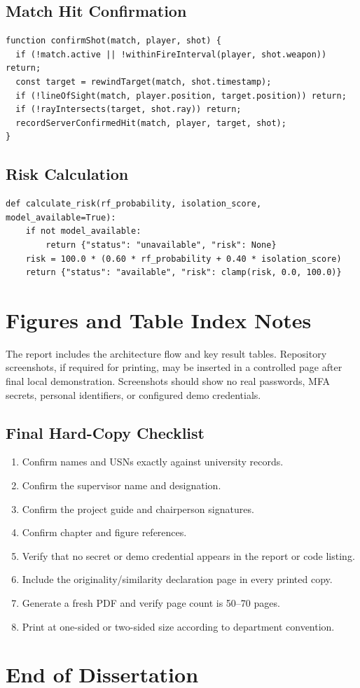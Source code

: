 \documentclass[12pt,a4paper,oneside]{report}
\begin{document}
\section{Match Hit Confirmation}
\begin{verbatim}
function confirmShot(match, player, shot) {
  if (!match.active || !withinFireInterval(player, shot.weapon)) return;
  const target = rewindTarget(match, shot.timestamp);
  if (!lineOfSight(match, player.position, target.position)) return;
  if (!rayIntersects(target, shot.ray)) return;
  recordServerConfirmedHit(match, player, target, shot);
}
\end{verbatim}

\section{Risk Calculation}
\begin{verbatim}
def calculate_risk(rf_probability, isolation_score, model_available=True):
    if not model_available:
        return {"status": "unavailable", "risk": None}
    risk = 100.0 * (0.60 * rf_probability + 0.40 * isolation_score)
    return {"status": "available", "risk": clamp(risk, 0.0, 100.0)}
\end{verbatim}

\chapter{Figures and Table Index Notes}
The report includes the architecture flow and key result tables. Repository screenshots, if required for printing, may be inserted in a controlled page after final local demonstration. Screenshots should show no real passwords, MFA secrets, personal identifiers, or configured demo credentials.

\section{Final Hard-Copy Checklist}
\begin{enumerate}
\item Confirm names and USNs exactly against university records.
\item Confirm the supervisor name and designation.
\item Confirm the project guide and chairperson signatures.
\item Confirm chapter and figure references.
\item Verify that no secret or demo credential appears in the report or code listing.
\item Include the originality/similarity declaration page in every printed copy.
\item Generate a fresh PDF and verify page count is 50--70 pages.
\item Print at one-sided or two-sided size according to department convention.
\end{enumerate}

\chapter*{End of Dissertation}
\end{document}
